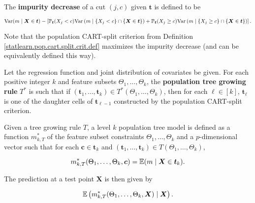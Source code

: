 \begin{definition}

The \textbf{impurity decrease} of a cut \((j,c)\) given \(\boldsymbol{t}\) is defined to be

\begin{equation}\label{statlearn.rf.imp.dec.def}
\mathrm{Var}(m \mid \boldsymbol{X} \in \boldsymbol{t}) - \left[ \mathbb{P}_{\boldsymbol{t}}(X_j < c) \mathrm{Var} \left(m \mid \{X_j < c \} \cap \{\boldsymbol{X} \in \boldsymbol{t}\} \right) +  \mathbb{P}_{\boldsymbol{t}}(X_j \geq c) \mathrm{Var} \left(m \mid \{X_j \geq c \} \cap \{\boldsymbol{X} \in \boldsymbol{t}\} \right) \right].
\end{equation}

Note that the population CART-split criterion from Definition \ref{statlearn.pop.cart.split.crit.def} maximizes the impurity decrease (and can be equivalently defined this way).

\end{definition}

\begin{definition}\label{stat.learn.pop.tree.grow.rule.def}

Let the regression function and joint distribution of covariates be given. For each positive integer \(k\) and feature subsets \(\Theta_1, \ldots, \Theta_k\), the \textbf{population tree growing rule} \(T^*\) is such that if \((\boldsymbol{t}_1, \ldots, \boldsymbol{t}_k) \in T^*(\Theta_1, \ldots, \Theta_k)\), then for each \(\ell \in [k]\), \(\boldsymbol{t}_\ell\) is one of the daughter cells of \(\boldsymbol{t}_{\ell - 1}\) constructed by the population CART-split criterion.

Given a tree growing rule \(T\), a level \(k\) population tree model is defined as a function \(m_{k, T}^*\) of the feature subset constraints \(\Theta_1, \ldots, \Theta_k\) and a \(p\)-dimensional vector such that for each \(\boldsymbol{c} \in \boldsymbol{t}_k\) and \((\boldsymbol{t}_1, \ldots, \boldsymbol{t}_k) \in T(\Theta_1, \ldots, \Theta_k)\), 

\begin{equation}\label{stat.learn.pop.tree.grow.rule.eq}
m_{k, T}^*(\Theta_1, \ldots, \Theta_k, \boldsymbol{c}) = \mathbb{E}(m \mid \boldsymbol{X} \in \boldsymbol{t}_k).
\end{equation}

The prediction at a test point \(\boldsymbol{X}\) is then given by 

\[
\mathbb{E} \left( m_{k, T}^*(\Theta_1, \ldots, \Theta_k, \boldsymbol{X})  \mid \boldsymbol{X} \right).
\]

\end{definition}





